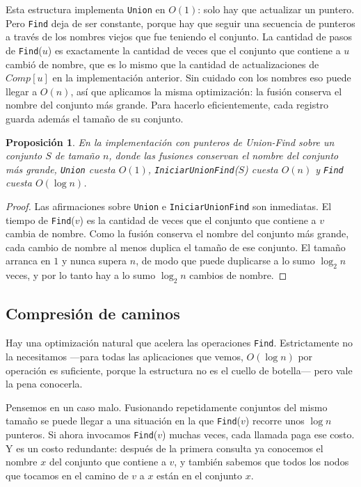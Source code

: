 \documentclass[12pt, spanish, oneside, openany]{book}
\theoremstyle{uprightplain}
\newtheorem{proposicion}[teorema]{Proposición}
\theoremstyle{definition}
\theoremstyle{remark}
\theoremstyle{definition}
\begin{document}
Esta estructura implementa \texttt{Union} en $O(1)$: solo hay que actualizar un puntero. Pero \texttt{Find} deja de ser constante, porque hay que seguir una secuencia de punteros a través de los nombres viejos que fue teniendo el conjunto. La cantidad de pasos de \texttt{Find}($u$) es exactamente la cantidad de veces que el conjunto que contiene a $u$ cambió de nombre, que es lo mismo que la cantidad de actualizaciones de $\mathit{Comp}[u]$ en la implementación anterior. Sin cuidado con los nombres eso puede llegar a $O(n)$, así que aplicamos la misma optimización: la fusión conserva el nombre del conjunto más grande. Para hacerlo eficientemente, cada registro guarda además el tamaño de su conjunto.

\begin{proposicion}
\label{prop:uf-punteros}
En la implementación con punteros de Union-Find sobre un conjunto $S$ de tamaño $n$, donde las fusiones conservan el nombre del conjunto más grande, \texttt{Union} cuesta $O(1)$, \texttt{IniciarUnionFind}($S$) cuesta $O(n)$ y \texttt{Find} cuesta $O(\log n)$.
\end{proposicion}
\begin{proof}
Las afirmaciones sobre \texttt{Union} e \texttt{IniciarUnionFind} son inmediatas. El tiempo de \texttt{Find}($v$) es la cantidad de veces que el conjunto que contiene a $v$ cambia de nombre. Como la fusión conserva el nombre del conjunto más grande, cada cambio de nombre al menos duplica el tamaño de ese conjunto. El tamaño arranca en $1$ y nunca supera $n$, de modo que puede duplicarse a lo sumo $\log_2 n$ veces, y por lo tanto hay a lo sumo $\log_2 n$ cambios de nombre.
\end{proof}

\subsection{Compresión de caminos}

Hay una optimización natural que acelera las operaciones \texttt{Find}. Estrictamente no la necesitamos ---para todas las aplicaciones que vemos, $O(\log n)$ por operación es suficiente, porque la estructura no es el cuello de botella--- pero vale la pena conocerla.

Pensemos en un caso malo. Fusionando repetidamente conjuntos del mismo tamaño se puede llegar a una situación en la que \texttt{Find}($v$) recorre unos $\log n$ punteros. Si ahora invocamos \texttt{Find}($v$) muchas veces, cada llamada paga ese costo. Y es un costo redundante: después de la primera consulta ya conocemos el nombre $x$ del conjunto que contiene a $v$, y también sabemos que todos los nodos que tocamos en el camino de $v$ a $x$ están en el conjunto $x$.
\end{document}
